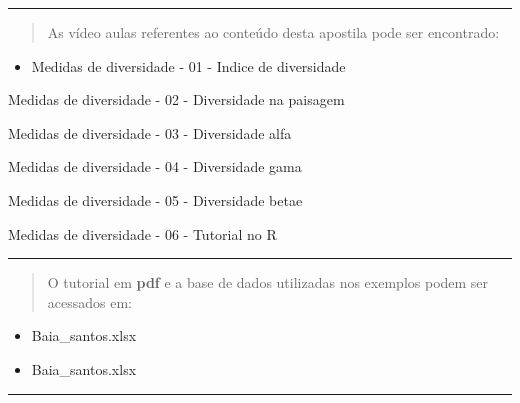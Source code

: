 \documentclass[
]{book}
\providecommand{\tightlist}{%
  \setlength{\itemsep}{0pt}\setlength{\parskip}{0pt}}
\begin{document}
\begin{center}\rule{0.5\linewidth}{0.5pt}\end{center}

\begin{quote}
As vídeo aulas referentes ao conteúdo desta apostila pode ser encontrado:
\end{quote}

\begin{itemize}
\tightlist
\item
  Medidas de diversidade - 01 - Indice de diversidade
\end{itemize}

Medidas de diversidade - 02 - Diversidade na paisagem

Medidas de diversidade - 03 - Diversidade alfa

Medidas de diversidade - 04 - Diversidade gama

Medidas de diversidade - 05 - Diversidade betae

Medidas de diversidade - 06 - Tutorial no R

\begin{center}\rule{0.5\linewidth}{0.5pt}\end{center}

\begin{quote}
O tutorial em \textbf{pdf} e a base de dados utilizadas nos exemplos podem ser acessados em:
\end{quote}

\begin{itemize}
\item
  Baia\_santos.xlsx
\item
  Baia\_santos.xlsx
\end{itemize}

\begin{center}\rule{0.5\linewidth}{0.5pt}\end{center}

  
\end{document}
